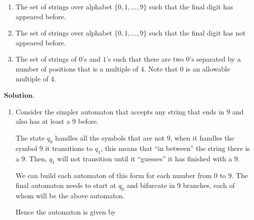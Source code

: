 \documentclass{article}
\theoremstyle{remark}
\begin{document}
\begin{enumerate}
    \begin{enumerate}
        \item[(a)] The set of strings over alphabet $\{0, 1, \ldots, 9\}$ such that the final digit has appeared before.
        
        \item[(b)] The set of strings over alphabet $\{0, 1, \ldots, 9\}$ such that the final digit has not appeared before.
        
        \item[(c)] The set of strings of $0$'s and $1$'s such that there are two $0$'s separated by a number of positions that is a multiple of $4$. Note that $0$ is an allowable multiple of $4$.
    \end{enumerate}
    $\textbf{Solution.}$
    \begin{enumerate}
        \item Consider the simpler automaton that accepts any string that ends in 9 and also has at least a 9 before.
        \begin{center}
        \end{center}
        The state $q_0$ handles all the symbols that are not $9$, when it handles the symbol $9$ it transitions to $q_1$,
        this means that ``in between'' the string there is a $9$. Then, $q_1$ will not transition until it ``guesses'' it has finished with a $9$.

        We can build each automaton of this form for each number from 0 to 9.
        The final automaton needs to start at $q_0$ and bifurcate in 9 branches, each of whom will be the 
        above automaton.

        Hence the automaton is given by
        \begin{center}
\end{center}
\end{enumerate}
\end{enumerate}
\end{document}

